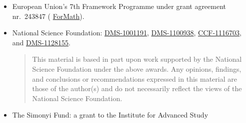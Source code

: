 {\begin{itemize}
\item European Union's 7th Framework Programme under grant agreement nr.\ 243847 (%
\href{http://wiki.portal.chalmers.se/cse/pmwiki.php/ForMath/ForMath/}{ForMath}). %

\item National Science Foundation:
  \href{http://www.nsf.gov/awardsearch/showAward.do?AwardNumber=1001191}{DMS-1001191}, %
  \href{http://www.nsf.gov/awardsearch/showAward.do?AwardNumber=1100938}{DMS-1100938}, %
  \href{http://www.nsf.gov/awardsearch/showAward.do?AwardNumber=1116703}{CCF-1116703}, %
  and
  \href{http://www.nsf.gov/awardsearch/showAward.do?AwardNumber=1128155}{DMS-1128155}. %
  {
    \setlength{\itemsep}{0pt}
    \begin{quote}
      \noindent\scriptsize
      This material is based in part upon work supported by the
      National Science Foundation under the above awards.  Any opinions,
      findings, and conclusions or recommendations expressed in this
      material are those of the author(s) and do not necessarily reflect the
      views of the National Science Foundation.
    \end{quote}
  }
\item The Simonyi Fund: a grant to the Institute for Advanced Study          %
  \end{itemize}


}
\cleartooddpage

